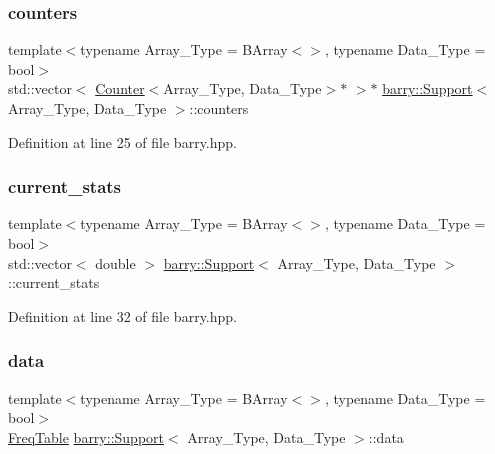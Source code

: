 \subsubsection{\texorpdfstring{counters}{counters}}
{\footnotesize\ttfamily template$<$typename Array\+\_\+\+Type  = B\+Array$<$$>$, typename Data\+\_\+\+Type  = bool$>$ \\
std\+::vector$<$ \hyperlink{classbarry_1_1_counter}{Counter}$<$Array\+\_\+\+Type, Data\+\_\+\+Type$>$$\ast$ $>$$\ast$ \hyperlink{classbarry_1_1_support}{barry\+::\+Support}$<$ Array\+\_\+\+Type, Data\+\_\+\+Type $>$\+::counters}



Definition at line 25 of file barry.\+hpp.

\mbox{\label{classbarry_1_1_support_a094f0851c7d6bfa7876eb0df2be4439e}} 
\subsubsection{\texorpdfstring{current\+\_\+stats}{current\_stats}}
{\footnotesize\ttfamily template$<$typename Array\+\_\+\+Type  = B\+Array$<$$>$, typename Data\+\_\+\+Type  = bool$>$ \\
std\+::vector$<$ double $>$ \hyperlink{classbarry_1_1_support}{barry\+::\+Support}$<$ Array\+\_\+\+Type, Data\+\_\+\+Type $>$\+::current\+\_\+stats}



Definition at line 32 of file barry.\+hpp.

\mbox{\label{classbarry_1_1_support_afae160c07727e72f36fcf5a16828ed21}} 
\subsubsection{\texorpdfstring{data}{data}}
{\footnotesize\ttfamily template$<$typename Array\+\_\+\+Type  = B\+Array$<$$>$, typename Data\+\_\+\+Type  = bool$>$ \\
\hyperlink{classbarry_1_1_freq_table}{Freq\+Table} \hyperlink{classbarry_1_1_support}{barry\+::\+Support}$<$ Array\+\_\+\+Type, Data\+\_\+\+Type $>$\+::data}



